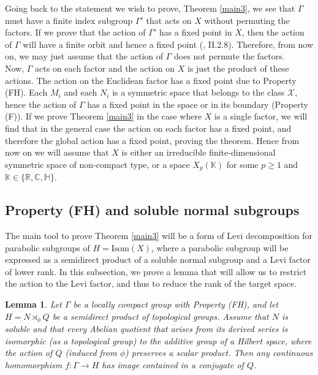 \documentclass{article}
\theoremstyle{definition}
\theoremstyle{remark}
\theoremstyle{plain}
\newtheorem{lem}[dfn]{Lemma}
\begin{document}
Going back to the statement we wish to prove, Theorem \ref{main3}, we see that $\Gamma$ must have a finite index subgroup $\Gamma'$ that acts on $X$ without permuting the factors. If we prove that the action of $\Gamma'$ has a fixed point in $X$, then the action of $\Gamma$ will have a finite orbit and hence a fixed point (\cite{bh}, II.2.8). Therefore, from now on, we may just assume that the action of $\Gamma$ does not permute the factors. \\

Now, $\Gamma$ acts on each factor and the action on $X$ is just the product of these actions. The action on the Euclidean factor has a fixed point due to Property (FH). Each $M_i$ and each $N_i$ is a symmetric space that belongs to the class $\mathcal{X}$, hence the action of $\Gamma$ has a fixed point in the space or in its boundary (Property (F)). If we prove Theorem \ref{main3} in the case where $X$ is a single factor, we will find that in the general case the action on each factor has a fixed point, and therefore the global action has a fixed point, proving the theorem. Hence from now on we will assume that $X$ is either an irreducible finite-dimensional symmetric space of non-compact type, or a space $X_p(\mathbb{K})$ for some $p\geq 1$ and $\mathbb{K}\in\{\mathbb{R},\mathbb{C},\mathbb{H}\}$. \\

\subsection{Property (FH) and soluble normal subgroups}

The main tool to prove Theorem \ref{main3} will be a form of Levi decomposition for parabolic subgroups of $H=\mathrm{Isom}(X)$, where a parabolic subgroup will be expressed as a semidirect product of a soluble normal subgroup and a Levi factor of lower rank. In this subsection, we prove a lemma that will allow us to restrict the action to the Levi factor, and thus to reduce the rank of the target space.

\begin{lem} \label{soluble}
    Let $\Gamma$ be a locally compact group with Property (FH), and let $H=N\rtimes_\phi Q$ be a semidirect product of topological groups. Assume that $N$ is soluble and that every Abelian quotient that arises from its derived series is isomorphic (as a topological group) to the additive group of a Hilbert space, where the action of $Q$ (induced from $\phi$) preserves a scalar product. Then any continuous homomorphism $f:\Gamma\rightarrow H$ has image contained in a conjugate of $Q$.
\end{lem}
\end{document}
